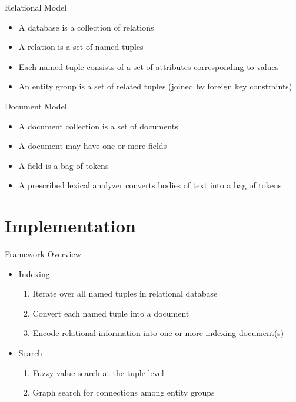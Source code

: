 \documentclass[compress]{beamer}
\begin{document}
		\begin{frame}{Relational Model}
			\begin{itemize}
				\item A \alert{database} is a collection of relations
				\item A \alert{relation} is a set of named tuples
				\item Each \alert{named tuple} consists of a set of attributes corresponding to values
				\item An \alert{entity group} is a set of related tuples (joined by foreign key constraints)
			\end{itemize}
		\end{frame}
		
		\begin{frame}{Document Model}
			\begin{itemize}
				\item A \alert{document collection} is a set of documents
				\item A \alert{document} may have one or more fields
				\item A \alert{field} is a bag of tokens
				\item A prescribed lexical \alert{analyzer} converts bodies of text into a bag of \alert{tokens}
			\end{itemize}
		\end{frame}
	
	\section{Implementation}
		\begin{frame}{Framework Overview}
			\begin{itemize}
				\item Indexing
					\begin{enumerate}
						\item \alert{Iterate} over all named tuples in relational database
						\item \alert{Convert} each named tuple into a document
						\item \alert{Encode} relational information into one or more \alert{indexing document(s)}
					\end{enumerate}
				\item Search
					\begin{enumerate}
						\item \alert{Fuzzy value search} at the tuple-level
						\item \alert{Graph search} for connections among entity groups
					\end{enumerate}
			\end{itemize}
		\end{frame}
		
\end{document}
